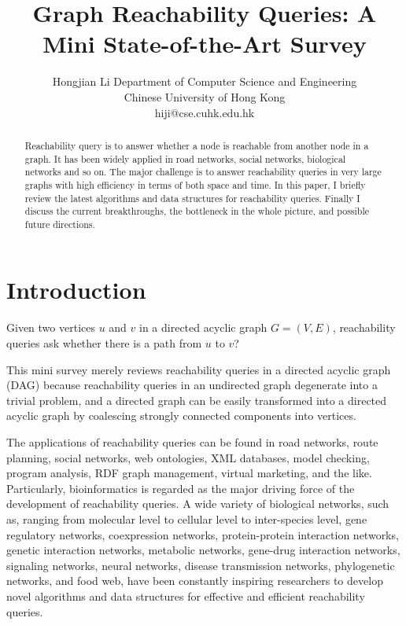 \documentclass[12pt,conference,compsocconf]{../IEEEtran}
\begin{document}
\title{Graph Reachability Queries: A Mini State-of-the-Art Survey}
\author
{
\IEEEauthorblockN
{
Hongjian Li
\IEEEauthorblockA
{
Department of Computer Science and Engineering\\
Chinese University of Hong Kong\\
hiji@cse.cuhk.edu.hk
}
}
}
\maketitle

\begin{abstract}

Reachability query is to answer whether a node is reachable from another node in a graph. It has been widely applied in road networks, social networks, biological networks and so on. The major challenge is to answer reachability queries in very large graphs with high efficiency in terms of both space and time. In this paper, I briefly review the latest algorithms and data structures for reachability queries. Finally I discuss the current breakthroughs, the bottleneck in the whole picture, and possible future directions.

\end{abstract}




\section{Introduction}

Given two vertices $u$ and $v$ in a directed acyclic graph $G = (V, E)$, reachability queries ask whether there is a path from $u$ to $v$?

This mini survey merely reviews reachability queries in a directed acyclic graph (DAG) because reachability queries in an undirected graph degenerate into a trivial problem, and a directed graph can be easily transformed into a directed acyclic graph by coalescing strongly connected components into vertices.

The applications of reachability queries can be found in road networks, route planning, social networks, web ontologies, XML databases, model checking, program analysis, RDF graph management, virtual marketing, and the like. Particularly, bioinformatics is regarded as the major driving force of the development of reachability queries. A wide variety of biological networks, such as, ranging from molecular level to cellular level to inter-species level, gene regulatory networks, coexpression networks, protein-protein interaction networks, genetic interaction networks, metabolic networks, gene-drug interaction networks, signaling networks, neural networks, disease transmission networks, phylogenetic networks, and food web, have been constantly inspiring researchers to develop novel algorithms and data structures for effective and efficient reachability queries.
\end{document}

